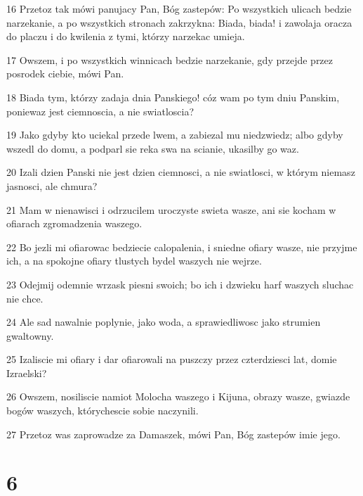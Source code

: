 \par 16 Przetoz tak mówi panujacy Pan, Bóg zastepów: Po wszystkich ulicach bedzie narzekanie, a po wszystkich stronach zakrzykna: Biada, biada! i zawolaja oracza do placzu i do kwilenia z tymi, którzy narzekac umieja.
\par 17 Owszem, i po wszystkich winnicach bedzie narzekanie, gdy przejde przez posrodek ciebie, mówi Pan.
\par 18 Biada tym, którzy zadaja dnia Panskiego! cóz wam po tym dniu Panskim, poniewaz jest ciemnoscia, a nie swiatloscia?
\par 19 Jako gdyby kto uciekal przede lwem, a zabiezal mu niedzwiedz; albo gdyby wszedl do domu, a podparl sie reka swa na scianie, ukasilby go waz.
\par 20 Izali dzien Panski nie jest dzien ciemnosci, a nie swiatlosci, w którym niemasz jasnosci, ale chmura?
\par 21 Mam w nienawisci i odrzucilem uroczyste swieta wasze, ani sie kocham w ofiarach zgromadzenia waszego.
\par 22 Bo jezli mi ofiarowac bedziecie calopalenia, i sniedne ofiary wasze, nie przyjme ich, a na spokojne ofiary tlustych bydel waszych nie wejrze.
\par 23 Odejmij odemnie wrzask piesni swoich; bo ich i dzwieku harf waszych sluchac nie chce.
\par 24 Ale sad nawalnie poplynie, jako woda, a sprawiedliwosc jako strumien gwaltowny.
\par 25 Izaliscie mi ofiary i dar ofiarowali na puszczy przez czterdziesci lat, domie Izraelski?
\par 26 Owszem, nosiliscie namiot Molocha waszego i Kijuna, obrazy wasze, gwiazde bogów waszych, którychescie sobie naczynili.
\par 27 Przetoz was zaprowadze za Damaszek, mówi Pan, Bóg zastepów imie jego.

\chapter{6}

